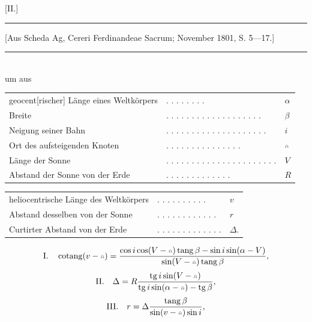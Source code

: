 \clearpage\begingroup\NoSourceHead{}
\begin{center}
[II.]\par{}\par\medskip
\rule{0.92\linewidth}{0.35pt}\par
{\small [Aus Scheda Ag, Cereri Ferdinandeae Sacrum; November 1801, S. 5—17.]}\par
\rule{0.92\linewidth}{0.35pt}\par\medskip
[1.]\par\medskip
{}\\um aus
\end{center}
\noindent{\small [S. 5]}\par
\begin{center}
\begin{tabular}{@{}l@{\quad}l@{\quad}l@{}}
geocent[rischer] Länge eines Weltkörpers & . . . . . . . . & $\alpha$\\
\hspace{3em}Breite & . . . . . . . . . . . . . . . . . . . & $\beta$\\
Neigung seiner Bahn & . . . . . . . . . . . . . . . . . . . . & $i$\\
Ort des aufsteigenden Knoten & . . . . . . . . . . . . . . . & $\AstNode$\\
Länge der Sonne & . . . . . . . . . . . . . . . . . . . . . . & $V$\\
Abstand der Sonne von der Erde & . . . . . . . . . . . . . & $R$
\end{tabular}\par\medskip
{}\par\medskip
\begin{tabular}{@{}l@{\quad}l@{\quad}l@{}}
heliocentrische Länge des Weltkörpers & . . . . . . . . . . & $v$\\
Abstand desselben von der Sonne & . . . . . . . . . . . . & $r$\\
Curtirter Abstand von der Erde & . . . . . . . . . . . . . & $\Delta$.
\end{tabular}
\end{center}
\[
\mathrm{I.}\quad\operatorname{cotang}(v-\AstNode)=\frac{\cos i\cos(V-\AstNode)\operatorname{tang}\beta-\sin i\sin(\alpha-V)}{\sin(V-\AstNode)\operatorname{tang}\beta},
\]
\[
\mathrm{II.}\quad\Delta=R\frac{\operatorname{tg}i\sin(V-\AstNode)}{\operatorname{tg}i\sin(\alpha-\AstNode)-\operatorname{tg}\beta},
\]
\[
\mathrm{III.}\quad r=\Delta\frac{\operatorname{tang}\beta}{\sin(v-\AstNode)\sin i},
\]
